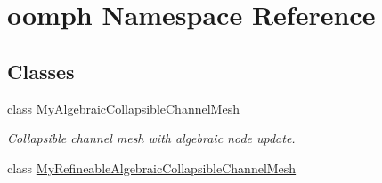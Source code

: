 \hypertarget{namespaceoomph}{}\section{oomph Namespace Reference}
\label{namespaceoomph}
\subsection*{Classes}
\begin{DoxyCompactItemize}
\item 
class \hyperlink{classoomph_1_1MyAlgebraicCollapsibleChannelMesh}{My\+Algebraic\+Collapsible\+Channel\+Mesh}
\begin{DoxyCompactList}\small\item\em Collapsible channel mesh with algebraic node update. \end{DoxyCompactList}\item 
class \hyperlink{classoomph_1_1MyRefineableAlgebraicCollapsibleChannelMesh}{My\+Refineable\+Algebraic\+Collapsible\+Channel\+Mesh}
\end{DoxyCompactItemize}
